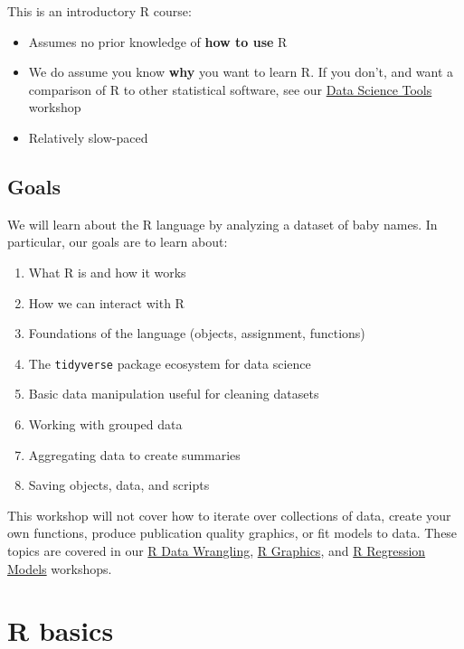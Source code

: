 \documentclass[
]{book}
\providecommand{\tightlist}{%
  \setlength{\itemsep}{0pt}\setlength{\parskip}{0pt}}
\begin{document}
This is an introductory R course:

\begin{itemize}
\tightlist
\item
  Assumes no prior knowledge of \textbf{how to use} R
\item
  We do assume you know \textbf{why} you want to learn R. If you don't, and want a comparison of R to other statistical software, see our \href{./DataScienceTools.html}{Data Science Tools} workshop
\item
  Relatively slow-paced
\end{itemize}

\hypertarget{goals}{%
\subsection{Goals}\label{goals}}

We will learn about the R language by analyzing a dataset of baby names. In particular, our goals are to learn about:

\begin{enumerate}
\def\labelenumi{\arabic{enumi}.}
\tightlist
\item
  What R is and how it works
\item
  How we can interact with R
\item
  Foundations of the language (objects, assignment, functions)
\item
  The \texttt{tidyverse} package ecosystem for data science
\item
  Basic data manipulation useful for cleaning datasets
\item
  Working with grouped data
\item
  Aggregating data to create summaries
\item
  Saving objects, data, and scripts
\end{enumerate}

This workshop will not cover how to iterate over collections of data, create your own functions, produce publication quality graphics, or fit models to data. These topics are covered in our \href{./RDataWrangling.html}{R Data Wrangling}, \href{./Rgraphics.html}{R Graphics}, and \href{./Rmodels.html}{R Regression Models} workshops.

\hypertarget{r-basics}{%
\section{R basics}\label{r-basics}}
\end{document}
